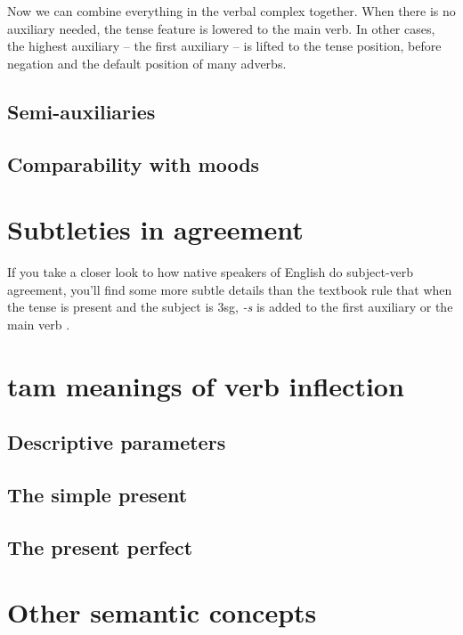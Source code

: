 \documentclass[UTF8, a4paper, oneside, scheme=plain]{ctexrep}
\newcommand*{\citesec}[1]{\S~{#1}}
\newcommand*{\citechap}[1]{Ch~{#1}}
\newcommand{\corpus}[1]{\emph{#1}}
\begin{document}
Now we can combine everything in the verbal complex together.
When there is no auxiliary needed,
the tense feature is lowered to the main verb. 
In other cases, the highest auxiliary -- the first auxiliary -- 
is lifted to the tense position,
before negation and the default position of many adverbs.

\subsection{Semi-auxiliaries}\label{sec:semi-auxiliary}

\subsection{Comparability with moods}\label{sec:tam-mood-compatibility}

\section{Subtleties in agreement}\label{sec:verb-inflection.agreement}

If you take a closer look to how native speakers of English do subject-verb agreement,
you'll find some more subtle details than 
the textbook rule that when the tense is \acl{present}
and the subject is 3sg, 
\corpus{-s} is added to the first auxiliary or the main verb
\citep[\citechap{5}, \citesec{18}]{cgel}.

\section{\acs{tam} meanings of verb inflection}

\subsection{Descriptive parameters}

\subsection{The simple present}

\subsection{The present perfect}

\section{Other semantic concepts}
\end{document}
